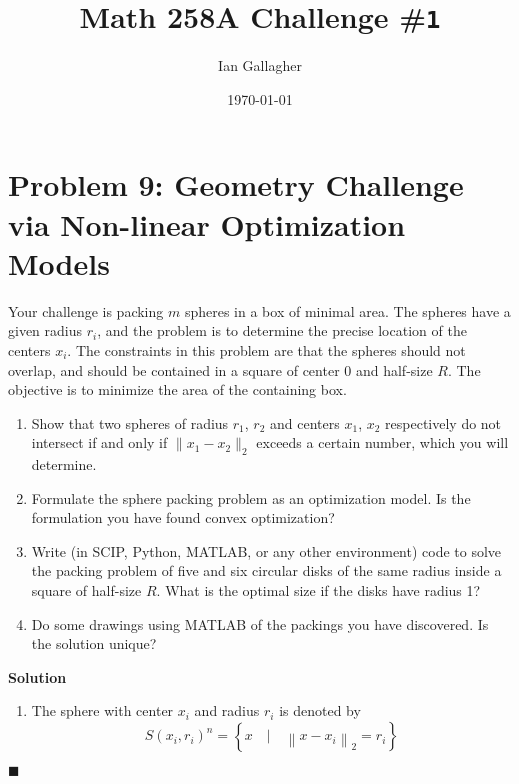 \documentclass[11pt]{article}
\title{Math 258A Challenge \#\texttt{1}}
\author{Ian Gallagher}
\date{\today}
\theoremstyle{problemstyle}
\newenvironment{solution}
  {\noindent\textbf{Solution}\quad}
  {\hfill$\blacksquare$\par\vspace{1em}}
\begin{document}
\maketitle

\section*{Problem 9: Geometry Challenge via Non-linear Optimization Models}
Your challenge is packing $m$ spheres in a box of minimal area. The spheres
have a given radius $r_i$, and the problem is to determine the precise location
of the centers $x_i$. The constraints in this problem are that the spheres
should not overlap, and should be contained in a square of center $0$ and
half-size $R$. The objective is to minimize the area of the containing box.

\begin{enumerate}
    \item Show that two spheres of radius $r_1$, $r_2$ and centers $x_1$, $x_2$
        respectively do not intersect if and only if $\|x_1 - x_2\|_2$ exceeds
        a certain number, which you will determine.
    \item Formulate the sphere packing problem as an optimization model. Is the
        formulation you have found convex optimization?
    \item Write (in SCIP, Python, MATLAB, or any other environment) code to
        solve the packing problem of five and six circular disks of the same
        radius inside a square of half-size $R$. What is the optimal size if
        the disks have radius 1?
    \item Do some drawings using MATLAB of the packings you have discovered. Is
        the solution unique?
\end{enumerate}

\begin{solution}

  \begin{enumerate}
    \item The sphere with center $x_i$ and radius $r_i$ is denoted by
      \[ 
        S(x_i, r_i)^n = \left\{ x \quad \vert \quad \left\lVert x - x_i
        \right\rVert_2 = r_i \right\}
      \]
  \end{enumerate}

\end{solution}
\end{document}
